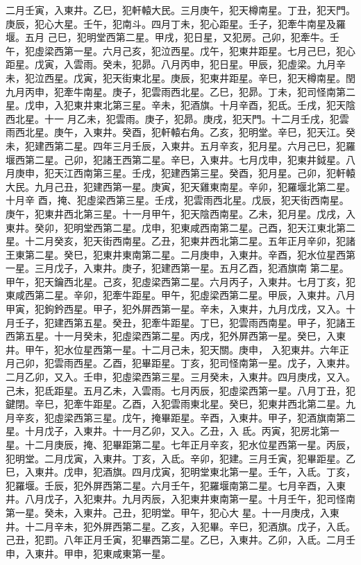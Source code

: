 \begin{pinyinscope}
 二月壬寅，入東井。乙巳，犯軒轅大民。三月庚午，犯天樽南星。丁丑，犯天門。庚辰，犯心大星。壬午，犯南斗。四月丁未，犯心距星。壬子，犯牽牛南星及羅堰。五月
 己巳，犯明堂西第二星。甲戌，犯日星，又犯房。己卯，犯牽牛。壬午，犯虛梁西第一星。六月己亥，犯泣西星。戊午，犯東井距星。七月己巳，犯心距星。戊寅，入雲雨。癸未，犯昴。八月丙申，犯日星。甲辰，犯虛梁。九月辛未，犯泣西星。戊寅，犯天街東北星。庚辰，犯東井距星。辛巳，犯天樽南星。閏九月丙申，犯牽牛南星。庚子，犯雲雨西北星。乙巳，犯昴。丁未，犯司怪南第二星。戊申，入犯東井東北第三星。辛未，犯酒旗。十月辛酉，犯氐。壬戌，犯天陰西北星。十一
 月乙未，犯雲雨。庚子，犯昴。庚戌，犯天門。十二月壬戌，犯雲雨西北星。庚午，入東井。癸酉，犯軒轅右角。乙亥，犯明堂。辛巳，犯天江。癸未，犯建西第二星。四年三月壬辰，入東井。五月辛亥，犯月星。六月己巳，犯羅堰西第二星。己卯，犯諸王西第二星。辛巳，入東井。七月戊申，犯東井鉞星。八月庚申，犯天江西南第三星。壬戌，犯建西第三星。癸酉，犯月星。己卯，犯軒轅大民。九月己丑，犯建西第一星。庚寅，犯天雞東南星。辛卯，犯羅堰北第二星。十月辛
 酉，掩、犯虛梁西第三星。壬戌，犯雲雨西北星。戊辰，犯天街西南星。庚午，犯東井西北第三星。十一月甲午，犯天陰西南星。乙未，犯月星。戊戌，入東井。癸卯，犯明堂西第二星。戊申，犯東咸西南第二星。己酉，犯天江東北第二星。十二月癸亥，犯天街西南星。乙丑，犯東井西北第二星。五年正月辛卯，犯諸王東第二星。癸巳，犯東井東南第二星。二月庚申，入東井。辛酉，犯水位星西第一星。三月戊子，入東井。庚子，犯建西第一星。五月乙酉，犯酒旗南
 第二星。甲午，犯天鑰西北星。己亥，犯虛梁西第二星。六月丙子，入東井。七月丁亥，犯東咸西第二星。辛卯，犯牽牛距星。甲午，犯虛梁西第二星。甲辰，入東井。八月甲寅，犯鉤鈐西星。甲子，犯外屏西第一星。辛未，入東井，九月戊戌，又入。十月壬子，犯建西第五星。癸丑，犯牽牛距星。丁巳，犯雲雨西南星。甲子，犯諸王西第五星。十一月癸未，犯虛梁西第二星。丙戌，犯外屏西第一星。癸巳，入東井。甲午，犯水位星西第一星。十二月己未，犯天關。庚申，
 入犯東井。六年正月己卯，犯雲雨西星。乙酉，犯畢距星。丁亥，犯司怪南第一星。戊子，入東井。二月乙卯，又入。壬申，犯虛梁西第三星。三月癸未，入東井。四月庚戌，又入。己未，犯氐距星。五月乙未，入雲雨。七月丙辰，犯虛梁西第一星。八月丁丑，犯鍵閉。辛巳，犯牽牛距星。乙酉，入犯雲雨東北星。癸巳，犯東井西北第二星。九月辛亥，犯虛梁西第三星。戊午，掩畢距星。辛酉，入東井。甲子，犯酒旗南第二星。十月戊子，入東井。十一月乙卯，又入。乙丑，入
 氐。丙寅，犯房北第一星。十二月庚辰，掩、犯畢距第二星。七年正月辛亥，犯水位星西第一星。丙辰，犯明堂。二月戊寅，入東井。丁亥，入氐。辛卯，犯建。三月壬寅，犯畢距星。乙巳，入東井。戊申，犯酒旗。四月戊寅，犯明堂東北第一星。壬午，入氐。丁亥，犯羅堰。壬辰，犯外屏西第二星。六月壬午，犯羅堰南第二星。七月辛酉，入東井。八月戊子，入犯東井。九月丙辰，入犯東井東南第一星。十月壬午，犯司怪南第一星。癸未，入東井。己丑，犯明堂。甲午，犯心大
 星。十一月庚戌，入東井。十二月辛未，犯外屏西第二星。乙亥，入犯畢。辛巳，犯酒旗。戊子，入氐。己丑，犯罰。八年正月壬寅，犯畢西第二星。乙巳，入東井。乙卯，入氐。二月壬申，入東井。甲申，犯東咸東第一星。




\end{pinyinscope}
